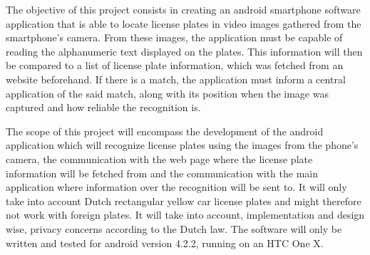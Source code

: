 
The objective of this project consists in creating an android smartphone software application that is able to locate license plates in video images gathered from the smartphone's camera. From these images, the application must be capable of reading the alphanumeric text displayed on the plates. This information will then be compared to a list of license plate information, which was fetched from an website beforehand. If there is a match, the application must inform a central application of the said match, along with its position when the image was captured and how reliable the recognition is.


The scope of this project will encompass the development of the android application which will recognize license plates using the images from the phone's camera, the communication with the web page where the license plate information will be fetched from and the communication with the main application where information over the recognition will be sent to. It will only take into account Dutch rectangular yellow car license plates and might therefore not work with foreign plates.
It will take into account, implementation and design wise, privacy concerns according to the Dutch law.
The software will only be written and tested for android version 4.2.2, running on an HTC One X.

